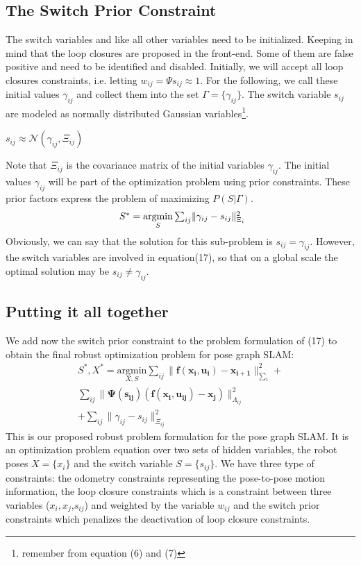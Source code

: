 \documentclass[9pt,technote]{IEEEtran}
\begin{document}
\subsection{The Switch Prior Constraint}
The switch variables  and like all other variables need to be initialized.
Keeping in mind that the loop closures are proposed in the front-end. Some of them are false positive and need to be identified and disabled.
Initially, we will accept all loop closures constraints, i.e.  letting $ w_{ij} = \Psi{s_{ij}} \approx 1 $.
For the following, we call these initial values $ \gamma_{ij}$  and collect them into the set $\Gamma = \{\gamma_{ij}\}$.
The switch variable $s_{ij}$ are modeled as normally distributed Gaussian variables\footnote{remember from equation (6) and (7)}.\\
\begin{center}
$ s_{ij}  \approx \mathcal{N}(\gamma_{ij}, \Xi_{ij} )$ 
\end{center}
Note that $\Xi_{ij}$ is the covariance matrix of the initial variables $\gamma_{ij}$.
The initial values $\gamma_{ij}$ will be part of the optimization problem using prior constraints.
These prior factors express the problem of maximizing
$P(S|\Gamma)$.
\begin{equation}
\centerline { $S^* = \underset{S}{\mathrm{argmin}} \sum_{ij} \lVert \gamma_{ij} - s_{ij} \rVert_{\Xi_{i}}^{2} $}
\end{equation} 
Obviously, we can say that the solution for this sub-problem is $s_{ij} = \gamma_{ij}$. However, the switch variables are involved in equation(17), so that on a global scale the optimal solution may be $s_{ij} \neq \gamma_{ij}$. 
\subsection{Putting it all together}
We add now the switch prior constraint to the problem formulation of (17) to obtain the final robust optimization problem for pose graph SLAM: 
\begin{multline}
S^*,X^* = 
\underset{X,S}{\mathrm{argmin}}
 \sum_{ij} \lVert \mathbf{f(x_i,u_{i}) - x_{i+1}}\rVert _{\sum_{i}} ^{2} + \\  
\sum_{ij}\lVert \mathbf{\Psi{(s_{ij})}(f(x_i,u_{ij}) - x_j)}\rVert _{\Lambda_{ij}} ^{2} \\ + \sum_{ij} \lVert \gamma_{ij} - s_{ij} \rVert_{\Xi_{ij}}^{2}      
\end{multline}
This is our proposed robust problem formulation for the pose graph SLAM. It is an optimization problem equation over two sets of hidden variables, the robot poses $X=\{x_{i}\}$ and the switch variable $S = \{s_{ij}\}$.
We have three type of constraints: the odometry constraints representing the pose-to-pose motion
information, the loop closure constraints which is a constraint between three variables ($x_{i},x_{j}$,$s_{ij}$) and weighted by the variable $w_{ij}$ and the switch prior constraints which penalizes the deactivation of loop closure constraints. 
\end{document}
